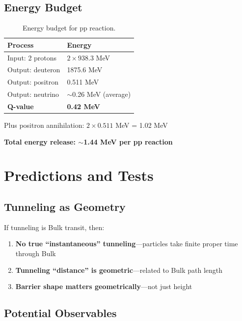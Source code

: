 \documentclass[12pt,a4paper]{article}
\begin{document}
\subsection{Energy Budget}

\begin{table}[H]
\centering
\begin{tabular}{@{}ll@{}}
\toprule
\textbf{Process} & \textbf{Energy} \\
\midrule
Input: 2 protons & $2 \times 938.3$ MeV \\
Output: deuteron & 1875.6 MeV \\
Output: positron & 0.511 MeV \\
Output: neutrino & $\sim$0.26 MeV (average) \\
\midrule
\textbf{Q-value} & \textbf{0.42 MeV} \\
\bottomrule
\end{tabular}
\caption{Energy budget for pp reaction.}
\end{table}

Plus positron annihilation: $2 \times 0.511$ MeV = 1.02 MeV

\textbf{Total energy release: $\sim$1.44 MeV per pp reaction}

\section{Predictions and Tests}

\subsection{Tunneling as Geometry}

If tunneling is Bulk transit, then:
\begin{enumerate}
    \item \textbf{No true ``instantaneous'' tunneling}---particles take finite proper time through Bulk
    \item \textbf{Tunneling ``distance'' is geometric}---related to Bulk path length
    \item \textbf{Barrier shape matters geometrically}---not just height
\end{enumerate}

\subsection{Potential Observables}
\end{document}
